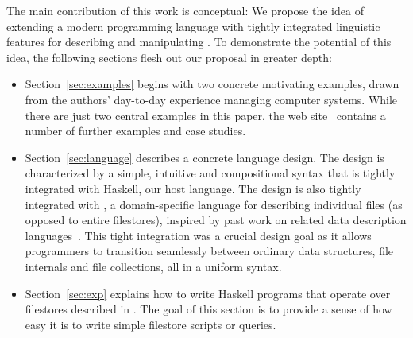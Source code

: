 The main contribution of this work is
conceptual: We propose the idea of extending a modern programming
language with tightly integrated linguistic features for
describing and manipulating \filestores{}.  To demonstrate
the potential of this idea, the following sections 
flesh out our proposal in greater depth:

\begin{itemize}
\item Section~\ref{sec:examples} begins with two concrete motivating 
examples, drawn from the authors' day-to-day experience managing
computer systems.  While there are just two central examples in this
paper, the \forest{} web site~\cite{forest-web-site} contains a number 
of further examples and case studies.~
\item Section~\ref{sec:language} describes a concrete language design.  
The design is characterized by a simple, 
intuitive and compositional syntax that is tightly integrated with
Haskell, our host language.  The design is also tightly integrated
with \padshaskell{}, a domain-specific language for describing 
individual
files (as opposed to entire filestores), inspired by past work
on related data description languages~\cite{fisher+:pads,fisher+:popl06,mandelbaum+:pads-ml,fisher+:toplas}.
This tight integration was a crucial design goal as it
allows programmers to transition seamlessly
between ordinary \haskell{} data structures, file internals and 
file collections, all in a uniform syntax.
~

\item Section~\ref{sec:exp} explains how to write Haskell programs
that operate over filestores described in \forest.  The goal of this
section is to provide a sense of how easy it is to write simple
filestore scripts or queries.


\end{itemize}
